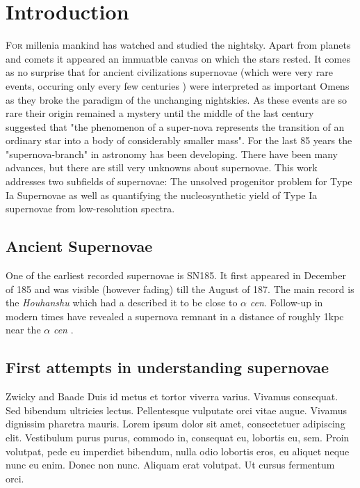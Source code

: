 \chapter{Introduction}
\label{chap:intro}

\lettrine[lines=4]{F}{or} millenia mankind has watched and studied the nightsky. Apart from planets and comets it appeared an immuatble canvas on which the stars rested. It comes as no surprise that for ancient civilizations supernovae (which were very rare events, occuring only every few centuries ) were interpreted as important Omens as they broke the paradigm of the unchanging nightskies. As these events are so rare their origin remained a mystery until the middle of the last century \citet{1934PNAS...20..254B} suggested that "the phenomenon of a super-nova represents the transition of an ordinary star into a body of considerably smaller mass". For the last 85 years the "supernova-branch" in astronomy has been developing. There have been many advances, but there are still very unknowns about supernovae. This work addresses two subfields of supernovae: The unsolved progenitor problem for Type Ia Supernovae as well as quantifying the nucleosynthetic yield of Type Ia supernovae from low-resolution spectra.


\section{Ancient Supernovae}
\label{sec:ancientsn}

One of the earliest recorded supernovae is SN185. It first appeared in December of 185 and was visible (however fading) till the August of 187. The main record is the \textit{Houhanshu} \citep{2006ChJAA...6..635Z} which had a described it to be close to $\alpha$ \textit{cen}. Follow-up in modern times have revealed a supernova remnant in a distance of roughly 1\;kpc near the $\alpha$ \textit{cen} \citep{2006ChJAA...6..635Z}. 

\section{First attempts in understanding supernovae}
\label{sec:}

Zwicky and Baade
Duis id metus et tortor viverra varius. Vivamus consequat. Sed
bibendum ultricies lectus. Pellentesque vulputate orci vitae
augue. Vivamus dignissim pharetra mauris. Lorem ipsum dolor sit amet,
consectetuer adipiscing elit. Vestibulum purus purus, commodo in,
consequat eu, lobortis eu, sem. Proin volutpat, pede eu imperdiet
bibendum, nulla odio lobortis eros, eu aliquet neque nunc eu
enim. Donec non nunc. Aliquam erat volutpat. Ut cursus fermentum orci.

